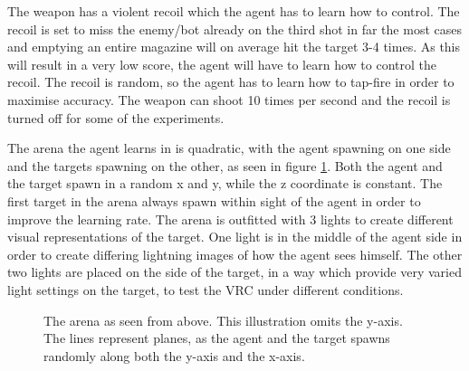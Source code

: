 The weapon has a violent recoil which the agent has to learn how to control. The recoil is set to miss the enemy/bot already on the third shot in far the most cases and emptying an entire magazine will on average hit the target 3-4 times. As this will result in a very low score, the agent will have to learn how to control the recoil. The recoil is random, so the agent has to learn how to tap-fire in order to maximise accuracy. The weapon can shoot 10 times per second and the recoil is turned off for some of the experiments.

The arena the agent learns in is quadratic, with the agent spawning on one side and the targets spawning on the other, as seen in figure \ref{fig:arena}. Both the agent and the target spawn in a random x and y, while the z coordinate is constant. The first target in the arena always spawn within sight of the agent in order to improve the learning rate. The arena is outfitted with 3 lights to create different visual representations of the target. One light is in the middle of the agent side in order to create differing lightning images of how the agent sees himself. The other two lights are placed on the side of the target, in a way which provide very varied light settings on the target, to test the VRC under different conditions.

\begin{figure}[H]
	\centering
	\begin{scriptsize}
		\sffamily
		
	\end{scriptsize}
	\caption[The FPS game arena]{The arena as seen from above. This illustration omits the y-axis. The lines represent planes, as the agent and the target spawns randomly along both the y-axis and the x-axis.}
	\label{fig:arena}
\end{figure}



















































